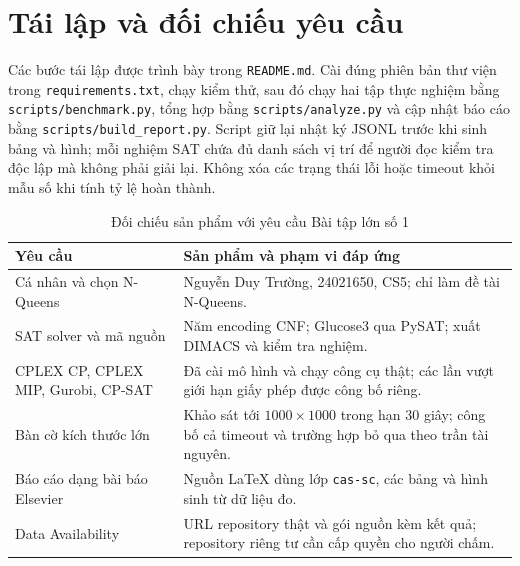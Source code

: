 \documentclass[a4paper,fleqn]{cas-sc}
\begin{document}
\appendix
\TheorySourceAppendix

\section{Tái lập và đối chiếu yêu cầu}
Các bước tái lập được trình bày trong \texttt{README.md}. Cài đúng phiên bản thư viện
trong \texttt{requirements.txt}, chạy kiểm thử, sau đó chạy hai tập thực nghiệm
bằng \texttt{scripts/benchmark.py}, tổng hợp bằng \texttt{scripts/analyze.py}
và cập nhật báo cáo bằng \texttt{scripts/build\_report.py}.
Script giữ lại nhật ký JSONL trước khi sinh bảng và hình; mỗi nghiệm SAT chứa đủ
danh sách vị trí để người đọc kiểm tra độc lập mà không phải giải lại.
Không xóa các trạng thái lỗi hoặc timeout khỏi mẫu số khi tính tỷ lệ hoàn thành.

\begin{table}[htbp]
\centering\small
\caption{Đối chiếu sản phẩm với yêu cầu Bài tập lớn số 1}
\begin{tabularx}{\linewidth}{p{.31\linewidth}X}
\toprule
Yêu cầu & Sản phẩm và phạm vi đáp ứng\\
\midrule
Cá nhân và chọn N-Queens & Nguyễn Duy Trường, 24021650, CS5; chỉ làm đề tài N-Queens.\\
SAT solver và mã nguồn & Năm encoding CNF; Glucose3 qua PySAT; xuất DIMACS và kiểm tra nghiệm.\\
CPLEX CP, CPLEX MIP, Gurobi, CP-SAT & Đã cài mô hình và chạy công cụ thật; các lần vượt giới hạn giấy phép được công bố riêng.\\
Bàn cờ kích thước lớn & Khảo sát tới $1000\times1000$ trong hạn 30 giây; công bố cả timeout và trường hợp bỏ qua theo trần tài nguyên.\\
Báo cáo dạng bài báo Elsevier & Nguồn LaTeX dùng lớp \texttt{cas-sc}, các bảng và hình sinh từ dữ liệu đo.\\
Data Availability & URL repository thật và gói nguồn kèm kết quả; repository riêng tư cần cấp quyền cho người chấm.\\
\bottomrule
\end{tabularx}
\end{table}
\end{document}
